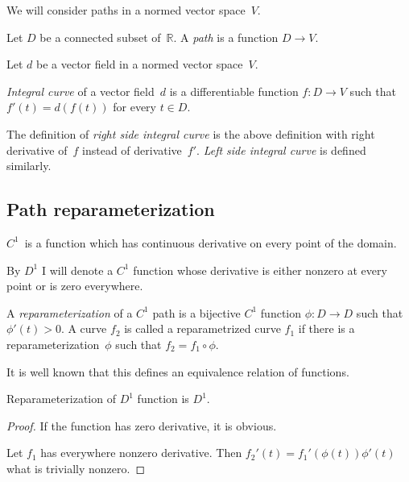 We will consider paths in a normed vector space~$V$.

\begin{defn}
Let $D$ be a connected subset of~$\mathbb{R}$. A \emph{path} is a function $D\rightarrow V$.
\end{defn}

Let $d$ be a vector field in a normed vector space~$V$.

\begin{defn}
\emph{Integral curve} of a vector field~$d$ is a differentiable function $f:D\rightarrow V$ such that $f'(t)=d(f(t))$ for every $t\in D$.
\end{defn}

\begin{defn}
The definition of \emph{right side integral curve} is the above definition with right derivative of~$f$ instead of derivative~$f'$.
\emph{Left side integral curve} is defined similarly.
\end{defn}

\subsection{Path reparameterization}

$C^1$~is a function which has continuous derivative on every point of the domain.

By $D^1$ I will denote a $C^1$ function whose derivative is either nonzero at every point or is zero everywhere.

\begin{defn}
A \emph{reparameterization} of a $C^1$ path is a bijective $C^1$ function $\phi:D\rightarrow D$ such that
$\phi'(t)>0$. A curve $f_2$ is called a reparametrized curve $f_1$ if there is a reparameterization~$\phi$ such that
$f_2=f_1\circ\phi$.
\end{defn}

It is well known that this defines an equivalence relation of functions.

\begin{prop}
Reparameterization of $D^1$ function is $D^1$.
\end{prop}

\begin{proof}
If the function has zero derivative, it is obvious.

Let $f_1$ has everywhere nonzero derivative. Then $f_2'(t) = f_1'(\phi(t))\phi'(t)$ what is trivially nonzero.
\end{proof}

